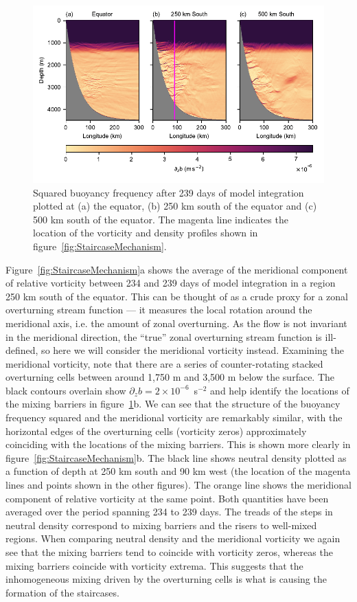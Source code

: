 \begin{figure}[h]
    \centering
    \includegraphics{../figures/Figure2.pdf}
    \caption{Squared buoyancy frequency after 239 days of model integration plotted at (a) the equator,  (b) 250 km south of the equator and (c) 500 km south of the equator. The magenta line indicates the location of the vorticity and density profiles shown in figure~\ref{fig:StaircaseMechanism}.}
    \label{fig:staircase}
\end{figure}

Figure~\ref{fig:StaircaseMechanism}a shows the average of the meridional component of relative vorticity between 234 and 239  days of model integration in a region 250 km south of the equator. This can be thought of as a crude proxy for a zonal overturning stream function --- it measures the local rotation around the meridional axis, i.e. the amount of zonal overturning. As the flow is not invariant in the meridional direction, the ``true'' zonal overturning stream function is ill-defined, so here we will consider the meridional vorticity instead. Examining the meridional vorticity, note that there are a series of counter-rotating stacked overturning cells between around 1,750 m and 3,500 m below the surface. The black contours overlain show $\partial_z b = 2 \times 10^{-6}$~s$^{-2}$ and help identify the locations of the mixing barriers in figure~\ref{fig:staircase}b. We can see that the structure of the buoyancy frequency squared and the meridional vorticity are remarkably similar, with the horizontal edges of the overturning cells (vorticity zeros) approximately coinciding with the locations of the mixing barriers. This is shown more clearly in figure~\ref{fig:StaircaseMechanism}b. The black line shows neutral density plotted as a function of depth at 250 km south and 90 km west (the location of the magenta lines and points shown in the other figures). The orange line shows the meridional component of relative vorticity at the same point. Both quantities have been averaged over the period spanning 234 to 239 days. The treads of the steps in neutral density correspond to mixing barriers and the risers to well-mixed regions. When comparing neutral density and the meridional vorticity we again see that the mixing barriers tend to coincide with vorticity zeros, whereas the mixing barriers coincide with vorticity extrema. This suggests that the inhomogeneous mixing driven by the overturning cells is what is causing the formation of the staircases.

